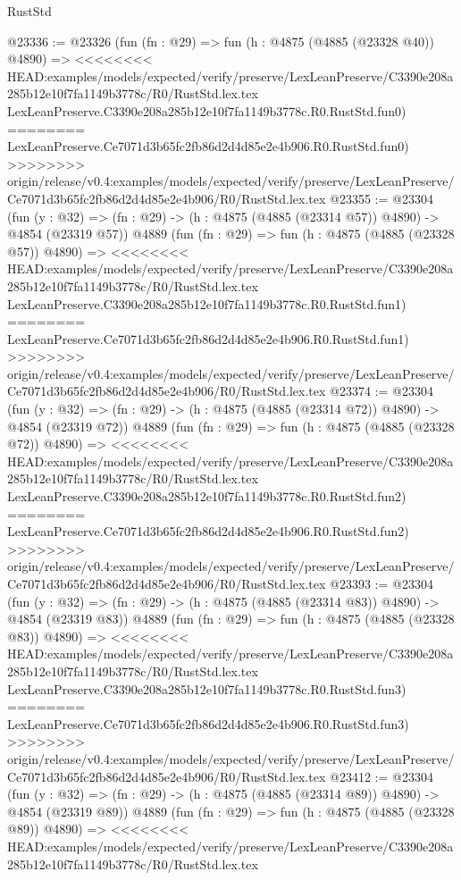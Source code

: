 \begin{lexlean}{RustStd}
\begin{coremodule}
{\begin{coremodule}
{{{{{{{{{{{{{{{{{{{{{{{{{{{{{@23336 := @23326
    (fun (fn : @29) =>
    fun (h : @4875 (@4885 (@23328 @40)) @4890) =>
<<<<<<<< HEAD:examples/models/expected/verify/preserve/LexLeanPreserve/C3390e208a285b12e10f7fa1149b3778c/R0/RustStd.lex.tex
    LexLeanPreserve.C3390e208a285b12e10f7fa1149b3778c.R0.RustStd.fun0)
========
    LexLeanPreserve.Ce7071d3b65fc2fb86d2d4d85e2e4b906.R0.RustStd.fun0)
>>>>>>>> origin/release/v0.4:examples/models/expected/verify/preserve/LexLeanPreserve/Ce7071d3b65fc2fb86d2d4d85e2e4b906/R0/RustStd.lex.tex
@23355 := @23304
    (fun (y : @32) => (fn : @29) -> (h : @4875 (@4885 (@23314 @57)) @4890) -> @4854 (@23319 @57))
    @4889
    (fun (fn : @29) =>
    fun (h : @4875 (@4885 (@23328 @57)) @4890) =>
<<<<<<<< HEAD:examples/models/expected/verify/preserve/LexLeanPreserve/C3390e208a285b12e10f7fa1149b3778c/R0/RustStd.lex.tex
    LexLeanPreserve.C3390e208a285b12e10f7fa1149b3778c.R0.RustStd.fun1)
========
    LexLeanPreserve.Ce7071d3b65fc2fb86d2d4d85e2e4b906.R0.RustStd.fun1)
>>>>>>>> origin/release/v0.4:examples/models/expected/verify/preserve/LexLeanPreserve/Ce7071d3b65fc2fb86d2d4d85e2e4b906/R0/RustStd.lex.tex
@23374 := @23304
    (fun (y : @32) => (fn : @29) -> (h : @4875 (@4885 (@23314 @72)) @4890) -> @4854 (@23319 @72))
    @4889
    (fun (fn : @29) =>
    fun (h : @4875 (@4885 (@23328 @72)) @4890) =>
<<<<<<<< HEAD:examples/models/expected/verify/preserve/LexLeanPreserve/C3390e208a285b12e10f7fa1149b3778c/R0/RustStd.lex.tex
    LexLeanPreserve.C3390e208a285b12e10f7fa1149b3778c.R0.RustStd.fun2)
========
    LexLeanPreserve.Ce7071d3b65fc2fb86d2d4d85e2e4b906.R0.RustStd.fun2)
>>>>>>>> origin/release/v0.4:examples/models/expected/verify/preserve/LexLeanPreserve/Ce7071d3b65fc2fb86d2d4d85e2e4b906/R0/RustStd.lex.tex
@23393 := @23304
    (fun (y : @32) => (fn : @29) -> (h : @4875 (@4885 (@23314 @83)) @4890) -> @4854 (@23319 @83))
    @4889
    (fun (fn : @29) =>
    fun (h : @4875 (@4885 (@23328 @83)) @4890) =>
<<<<<<<< HEAD:examples/models/expected/verify/preserve/LexLeanPreserve/C3390e208a285b12e10f7fa1149b3778c/R0/RustStd.lex.tex
    LexLeanPreserve.C3390e208a285b12e10f7fa1149b3778c.R0.RustStd.fun3)
========
    LexLeanPreserve.Ce7071d3b65fc2fb86d2d4d85e2e4b906.R0.RustStd.fun3)
>>>>>>>> origin/release/v0.4:examples/models/expected/verify/preserve/LexLeanPreserve/Ce7071d3b65fc2fb86d2d4d85e2e4b906/R0/RustStd.lex.tex
@23412 := @23304
    (fun (y : @32) => (fn : @29) -> (h : @4875 (@4885 (@23314 @89)) @4890) -> @4854 (@23319 @89))
    @4889
    (fun (fn : @29) =>
    fun (h : @4875 (@4885 (@23328 @89)) @4890) =>
<<<<<<<< HEAD:examples/models/expected/verify/preserve/LexLeanPreserve/C3390e208a285b12e10f7fa1149b3778c/R0/RustStd.lex.tex
}}}}}}}}}}}}}}}}}}}}}}}}}}}}}
\end{coremodule}}
\end{coremodule}
\end{lexlean}
